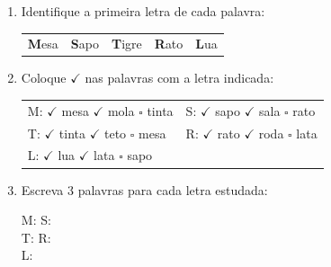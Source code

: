 \begin{exercicio}
\begin{enumerate}
  \item Identifique a primeira letra de cada palavra:
  \begin{center}
  \begin{tabular}{ccccc}
  \textbf{M}esa & \textbf{S}apo & \textbf{T}igre & \textbf{R}ato & \textbf{L}ua \\
  \end{tabular}
  \end{center}

  \item Coloque $\checkmark$ nas palavras com a letra indicada:
  \begin{center}
  \begin{tabular}{ll}
  M: $\checkmark$ mesa \quad $\checkmark$ mola \quad $\square$ tinta & S: $\checkmark$ sapo \quad $\checkmark$ sala \quad $\square$ rato \\
  T: $\checkmark$ tinta \quad $\checkmark$ teto \quad $\square$ mesa & R: $\checkmark$ rato \quad $\checkmark$ roda \quad $\square$ lata \\
  L: $\checkmark$ lua \quad $\checkmark$ lata \quad $\square$ sapo &
  \end{tabular}
  \end{center}

  \item Escreva 3 palavras para cada letra estudada:
  \begin{center}
  M: \underline{\hspace{1.8cm}} \underline{\hspace{1.8cm}} \underline{\hspace{1.8cm}} \quad S: \underline{\hspace{1.8cm}} \underline{\hspace{1.8cm}} \underline{\hspace{1.8cm}}\\[0.5em]
  T: \underline{\hspace{1.8cm}} \underline{\hspace{1.8cm}} \underline{\hspace{1.8cm}} \quad R: \underline{\hspace{1.8cm}} \underline{\hspace{1.8cm}} \underline{\hspace{1.8cm}}\\[0.5em]
  L: \underline{\hspace{1.8cm}} \underline{\hspace{1.8cm}} \underline{\hspace{1.8cm}}
  \end{center}
\end{enumerate}


\end{exercicio}
